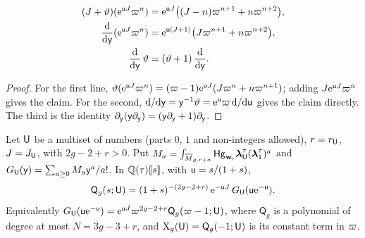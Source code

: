 \begin{lem}\label{lem:van-ops}
\begin{align*}
(J+\vartheta)(\mathrm{e}^{\mathsf{u} J}\varpi^n)&=\mathrm{e}^{\mathsf{u} J}\bigl((J-n)\varpi^{n+1}+n\varpi^{n+2}\bigr),\\
\frac{\mathrm{d}}{\mathrm{d}\mathsf{y}}(\mathrm{e}^{\mathsf{u} J}\varpi^n)&=\mathrm{e}^{\mathsf{u}(J+1)}\bigl(J\varpi^{n+1}+n\varpi^{n+2}\bigr),\\
\frac{\mathrm{d}}{\mathrm{d}\mathsf{y}}\,\vartheta&=(\vartheta+1)\,\frac{\mathrm{d}}{\mathrm{d}\mathsf{y}}.
\end{align*}
\end{lem}

\begin{proof}
For the first line, $\vartheta(\mathrm{e}^{\mathsf{u} J}\varpi^n)=(\varpi-1)\mathrm{e}^{\mathsf{u} J}(J\varpi^n+n\varpi^{n+1})$; adding $J\mathrm{e}^{\mathsf{u} J}\varpi^n$ gives the claim. For the second, $\mathrm{d}/\mathrm{d}\mathsf{y}=\mathsf{y}^{-1}\vartheta=\mathrm{e}^{\mathsf{u}}\varpi\,\mathrm{d}/\mathrm{d}\mathsf{u}$ gives the claim directly. The third is the identity $\partial_{\mathsf{y}}(\mathsf{y}\partial_{\mathsf{y}})=(\mathsf{y}\partial_{\mathsf{y}}+1)\partial_{\mathsf{y}}$.
\end{proof}

\begin{lem}\label{lem:van-dil}
Let $\mathsf{U}$ be a multiset of numbers (parts $0$, $1$ and non-integers allowed), $r=r_{\mathsf{U}}$, $J=J_{\mathsf{U}}$, with $2g-2+r>0$. Put $M_a=\int_{\overline{M}_{g,r+a}}\mathsf{Hg}_{\mathbf{w}_{\!\tau}}\boldsymbol{\lambda}^{\tau}_{\mathsf{U}}(\boldsymbol{\lambda}^{\tau}_1)^{a}$ and $G_{\mathsf{U}}(\mathsf{y})=\sum_{a\geq 0}M_a\mathsf{y}^a/a!$. In $\mathbb{Q}(\tau)[\![ s ]\!]$, with $\mathsf{u}=s/(1+s)$,
\begin{equation}\label{eq:van-dil}
\mathsf{Q}_g(s;\mathsf{U})=(1+s)^{-(2g-2+r)}\,\mathrm{e}^{-\mathsf{u} J}\,G_{\mathsf{U}}(\mathsf{u}\mathrm{e}^{-\mathsf{u}}).
\end{equation}
Equivalently $G_{\mathsf{U}}(\mathsf{u}\mathrm{e}^{-\mathsf{u}})=\mathrm{e}^{\mathsf{u} J}\varpi^{2g-2+r}\mathsf{Q}_g(\varpi-1;\mathsf{U})$, where $\mathsf{Q}_g$ is a polynomial of degree at most $N=3g-3+r$, and $\mathrm{X}_g(\mathsf{U})=\mathsf{Q}_g(-1;\mathsf{U})$ is its constant term in $\varpi$.
\end{lem}

